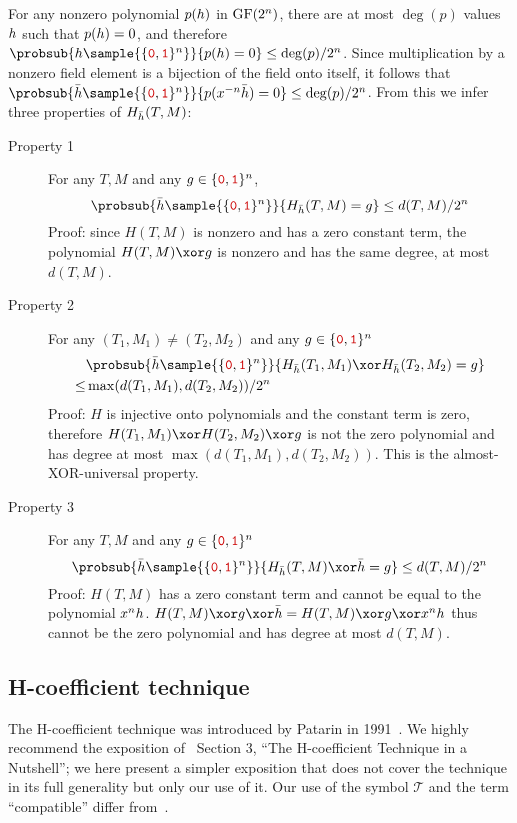 \documentclass[hctr2.tex]{subfiles}
\begin{document}
For any nonzero polynomial \(p(h)\)
in \(\operatorname{GF}(2^n)\), there are at most \(\deg(p)\) values \(h\)
such that \(p(h) = 0\), and therefore
\(\probsub{\hpoly\sample{\bin^n}}{p(\hpoly) = 0} \leq \deg(p)/2^n\).
Since multiplication by a nonzero field element
is a bijection of the field onto itself, it follows that
\(\probsub{\hgen\sample{\bin^n}}{p(x^{-n}\hgen) = 0} \leq \deg(p)/2^n\).
From this we infer three properties of \(H_{\bar{h}}(T, M)\):
\begin{description}
    \item[Property 1]
    For any \(T, M\) and any \(g \in \bin^n\),
    \begin{displaymath}
        \probsub{\hgen\sample{\bin^n}}{H_{\hgen}(T, M) = g} \leq d(T, M)/2^n
    \end{displaymath}
    Proof: since \(H(T, M)\) is nonzero and has
    a zero constant term,
    the polynomial \(H(T, M) \xor g\) 
    is nonzero and has the same degree, at most \(d(T, M)\).
    \item[Property 2] 
    For any \((T_1, M_1) \neq (T_2, M_2)\) and any \(g \in \bin^n\)
    \begin{align*}
        & \probsub{\hgen\sample{\bin^n}}{H_{\hgen}(T_1, M_1) \xor H_{\hgen}(T_2, M_2) = g} \\
        \leq  & \max(d(T_1, M_1), d(T_2, M_2))/2^n
    \end{align*}
    Proof: \(H\) is injective onto polynomials
    and the constant term is zero, therefore
    \(H(T_1, M_1) \xor H(T_2, M_2) \xor g\)
    is not the zero polynomial and
    has degree at most \(\max(d(T_1, M_1), d(T_2, M_2))\).
    This is the almost-XOR-universal property.
    \item[Property 3]
    For any \(T, M\) and any \(g \in \bin^n\)
    \begin{displaymath}
        \probsub{\hgen\sample{\bin^n}}{H_{\hgen}(T, M) \xor \hgen = g} \leq d(T, M)/2^n
    \end{displaymath}
    Proof: \(H(T, M)\) has a zero constant term and
    cannot be equal to the polynomial \(x^nh\).
    \(H(T, M) \xor g \xor \hgen = H(T, M) \xor g \xor x^n\hpoly\)
    thus cannot be the zero polynomial and has
    degree at most \(d(T, M)\).
\end{description}

\subsection{H-coefficient technique}\label{hco}
The H-coefficient technique was introduced by Patarin in 1991~\cite{ppdes,hco}.
We highly recommend the exposition
of~\cite{hco2} Section 3,
``The H-coefficient Technique in a Nutshell'';
we here present a simpler exposition that
does not cover the technique in its full
generality but only our use of it.
Our use of the symbol \(\mathcal{T}\) and the term
``compatible'' differ from~\cite{hco2}.
\end{document}
